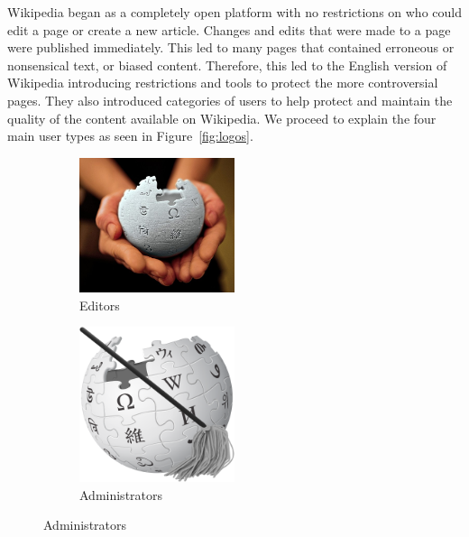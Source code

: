 Wikipedia began as a completely open platform with no restrictions on who could edit a page or create a new article.
Changes and edits that were made to a page were published immediately.
This led to many pages that contained erroneous or nonsensical text, or biased content.
Therefore, this led to the English version of Wikipedia introducing restrictions and tools to protect the more controversial pages.
They also introduced categories of users to help protect and maintain the quality of the content available on Wikipedia.
We proceed to explain the four main user types as seen in Figure~\ref{fig:logos}. 
\begin{figure}[h!]
    \centering
    \begin{subfigure}[b]{0.49\textwidth}
        \centering
        \includegraphics[width=0.5\textwidth]{images/wikipedians.jpg}
        \caption{Editors}
        \label{fig:editors}
    \end{subfigure}
    \begin{subfigure}[b]{0.49\textwidth}
        \centering
        \includegraphics[width=0.5\textwidth]{images/admins.png}
        \caption{Administrators}
        \label{fig:admins}
    \end{subfigure}


\end{figure}
